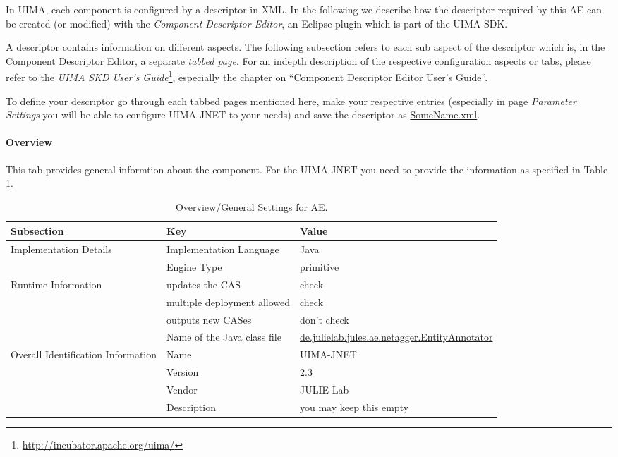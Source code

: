 \documentclass[11pt,a4paper,halfparskip]{scrartcl}
\begin{document}
In UIMA, each component is configured by a descriptor in XML. In the
following we describe how the descriptor required by this AE can be
created (or modified) with the \emph{Component Descriptor Editor}, an
Eclipse plugin which is part of the UIMA SDK.

A descriptor contains information on different aspects. The following
subsection refers to each sub aspect of the descriptor which is, in
the Component Descriptor Editor, a separate \emph{tabbed page}. For an
indepth description of the respective configuration aspects or tabs,
please refer to the \emph{UIMA SKD User's
  Guide}\footnote{\url{http://incubator.apache.org/uima/}}, especially
the chapter on ``Component Descriptor Editor User's Guide''.

To define your descriptor go through each tabbed pages mentioned here,
make your respective entries (especially in page \emph{Parameter
  Settings} you will be able to configure UIMA-JNET to your needs) and
save the descriptor as \url{SomeName.xml}.

\paragraph{Overview}
This tab provides general informtion about the component. For the UIMA-JNET
you need to provide the information as specified in Table
\ref{tab:overview}.

\begin{table}[h!]
  \centering
  \begin{tabular}{|p{3.5cm}|p{4cm}|p{6cm}|}
    \hline
    Subsection & Key & Value \\
    \hline\hline
    Implementation Details & Implementation Language &  Java\\
    \cline{2-3}
    & Engine Type & primitive\\
    \hline
    Runtime Information & updates the CAS & check \\
    \cline{2-3}
    & multiple deployment allowed & check\\
    \cline{2-3}
    & outputs new CASes & don't check \\
    \cline{2-3}
    & Name of the Java class file & \url{de.julielab.jules.ae.netagger.EntityAnnotator}\\
    \hline
    Overall Identification Information & Name & UIMA-JNET \\
    \cline{2-3}
    & Version &  2.3\\
    \cline{2-3}
    & Vendor & JULIE Lab\\
    \cline{2-3}
    & Description & you may keep this empty\\
    \hline
  \end{tabular}
  \caption{Overview/General Settings for AE.}
  \label{tab:overview}
\end{table}
\end{document}
